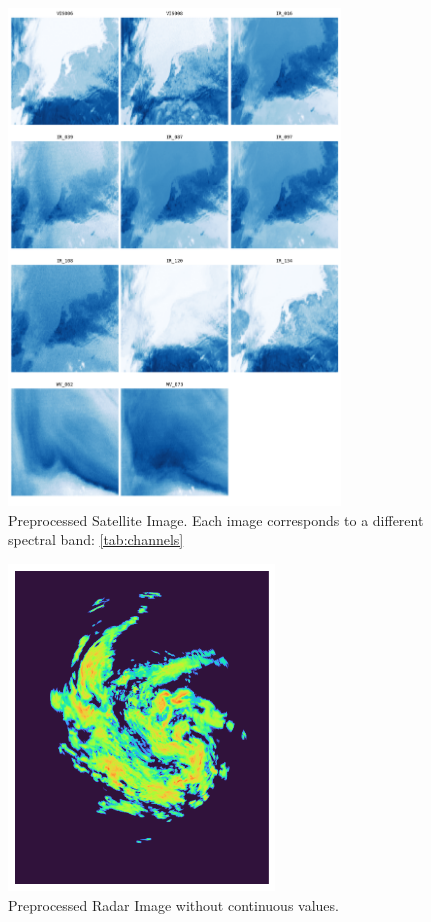 \documentclass[acmtog, screen, balance]{acmart}
\begin{document}
\begin{figure}[hbp]
  \centering
  \includegraphics[width=250pt]{./images/single_satellite.png}
  \caption{Preprocessed Satellite Image. Each image corresponds to a different spectral band: \ref{tab:channels}}
  \Description{}
  \label{fig:satchannels}
\end{figure}

\begin{figure}[hbp]
  \centering
  \includegraphics[width=200pt]{./images/radar_image.png}
  \caption{Preprocessed Radar Image without continuous values.}
  \Description{}
  \label{fig:radar-pre}
\end{figure}
\end{document}
